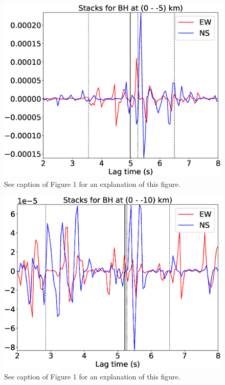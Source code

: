 \documentclass[letterpaper, 12pt]{article}
\begin{document}
\begin{figure}[H]
\includegraphics[width=\linewidth]{figures/intervals/BH_000_-05_stacks.eps}
\caption{See caption of Figure 1 for an explanation of this figure.}
\end{figure}

\begin{figure}[H]
\includegraphics[width=\linewidth]{figures/intervals/BH_000_-10_stacks.eps}
\caption{See caption of Figure 1 for an explanation of this figure.}
\end{figure}
\end{document}

